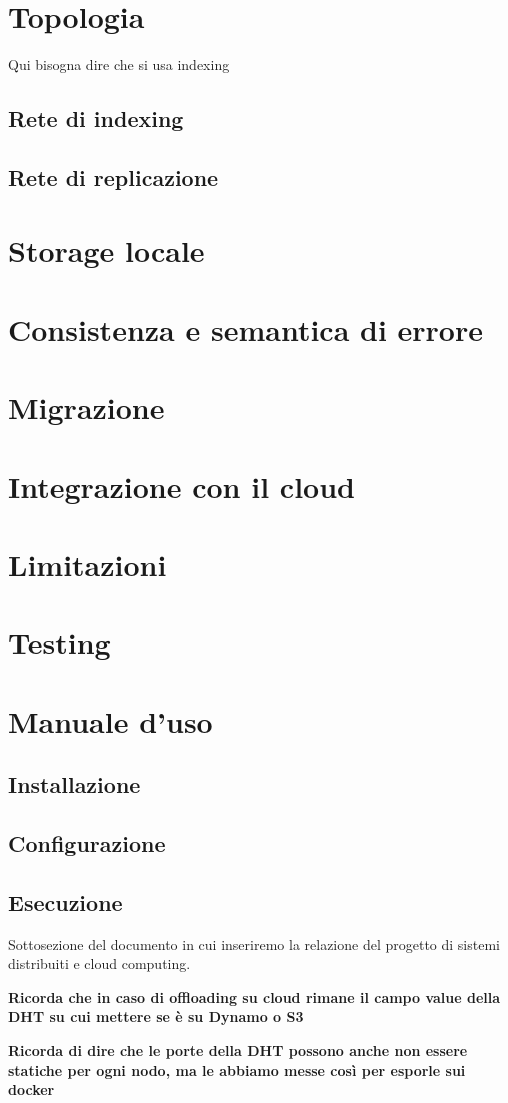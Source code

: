 \documentclass[conference]{IEEEtran}
\begin{document}
\section{Topologia}
Qui bisogna dire che si usa indexing
\subsection{Rete di indexing}
\subsection{Rete di replicazione}
\section{Storage locale}
\section{Consistenza e semantica di errore}
\section{Migrazione}
\section{Integrazione con il cloud}
\section{Limitazioni}
\section{Testing}
\section{Manuale d'uso}
\subsection{Installazione}
\subsection{Configurazione}
\subsection{Esecuzione}

Sottosezione del documento in cui inseriremo la relazione del progetto di sistemi
distribuiti e cloud computing.

\textbf{Ricorda che in caso di offloading su cloud rimane il campo value della DHT su cui mettere se è su Dynamo o S3}

\textbf{Ricorda di dire che le porte della DHT possono anche non essere statiche per ogni nodo, ma le abbiamo messe così per esporle sui docker}

\printbibliography
\end{document}
